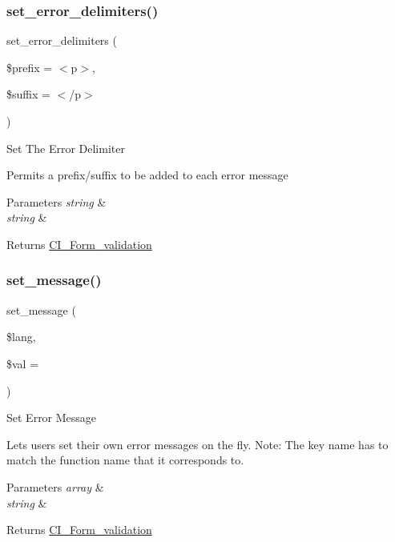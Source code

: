 \subsubsection{\texorpdfstring{set\+\_\+error\+\_\+delimiters()}{set\_error\_delimiters()}}
{\footnotesize\ttfamily set\+\_\+error\+\_\+delimiters (\begin{DoxyParamCaption}\item[{}]{\$prefix = {\ttfamily \textquotesingle{}$<$p$>$\textquotesingle{}},  }\item[{}]{\$suffix = {\ttfamily \textquotesingle{}$<$/p$>$\textquotesingle{}} }\end{DoxyParamCaption})}

Set The Error Delimiter

Permits a prefix/suffix to be added to each error message


\begin{DoxyParams}{Parameters}
{\em string} & \\
\hline
{\em string} & \\
\hline
\end{DoxyParams}
\begin{DoxyReturn}{Returns}
\mbox{\hyperlink{class_c_i___form__validation}{C\+I\+\_\+\+Form\+\_\+validation}} 
\end{DoxyReturn}
\mbox{\label{class_c_i___form__validation_a5a0dc4d3aef1f228155320a1d5275895}} 
\subsubsection{\texorpdfstring{set\+\_\+message()}{set\_message()}}
{\footnotesize\ttfamily set\+\_\+message (\begin{DoxyParamCaption}\item[{}]{\$lang,  }\item[{}]{\$val = {\ttfamily \textquotesingle{}\textquotesingle{}} }\end{DoxyParamCaption})}

Set Error Message

Lets users set their own error messages on the fly. Note\+: The key name has to match the function name that it corresponds to.


\begin{DoxyParams}{Parameters}
{\em array} & \\
\hline
{\em string} & \\
\hline
\end{DoxyParams}
\begin{DoxyReturn}{Returns}
\mbox{\hyperlink{class_c_i___form__validation}{C\+I\+\_\+\+Form\+\_\+validation}} 
\end{DoxyReturn}
\mbox{\label{class_c_i___form__validation_a9e66e3cdc5ceb81c054d48e1203613f2}} 
